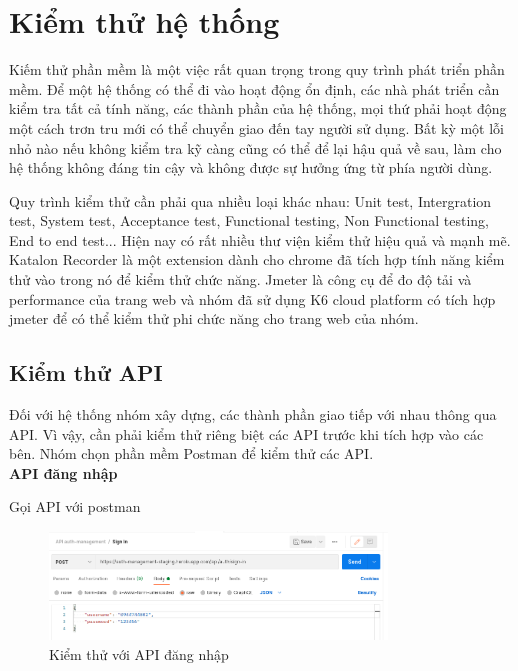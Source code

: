 \chapter{Kiểm thử hệ thống}\label{chap:testing}
		Kiếm thử phần mềm là một việc rất quan trọng trong quy trình phát triển phần mềm.
        Để một hệ thống có thể đi vào hoạt động ổn định, các nhà phát triển cần kiểm tra tất
        cả tính năng, các thành phần của hệ thống, mọi thứ phải hoạt động một cách trơn tru
        mới có thể chuyển giao đến tay người sử dụng. Bất kỳ một lỗi nhỏ nào nếu không kiểm
        tra kỹ càng cũng có thể để lại hậu quả về sau, làm cho hệ thống không đáng tin cậy và
        không được sự hưởng ứng từ phía người dùng.
        
        Quy trình kiểm thử cần phải qua nhiều loại khác nhau: Unit test, Intergration test, System test, Acceptance test, Functional testing, Non Functional testing, End to end test... Hiện nay có rất nhiều thư viện kiểm thử hiệu quả và mạnh mẽ. Katalon Recorder là một extension dành cho chrome đã tích hợp tính năng kiểm thử vào trong nó để kiểm thử chức năng. Jmeter là công cụ để đo độ tải và performance của trang web và nhóm đã sử dụng K6 cloud platform có tích hợp jmeter để có thể kiểm thử phi chức năng cho trang web của nhóm.
		\section{Kiểm thử API}
		Đối với hệ thống nhóm xây dựng, các thành phần giao tiếp với nhau thông qua API. Vì vậy, cần phải kiểm thử riêng biệt các API trước khi tích hợp vào các bên. Nhóm chọn phần mềm Postman để kiểm thử các API.\\
		
		\textbf{API đăng nhập}
		
		Gọi API với postman
		
		\begin{figure}[!ht]
			\includegraphics[width=0.8\textwidth]{Images/testing/API-sign-in.png}
			\centering
			\linebreak
			\caption{Kiểm thử với API đăng nhập}
		\end{figure}
		
